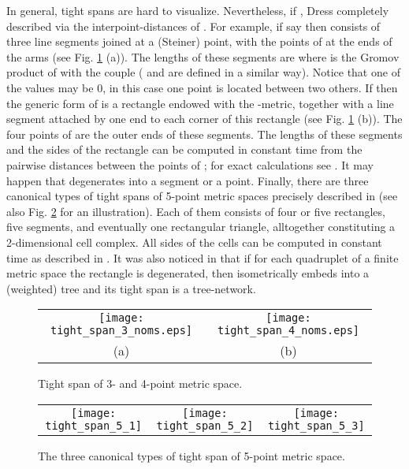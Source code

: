 \documentclass[11pt]{amsart}
\begin{document}
In general, tight spans are hard to
visualize. Nevertheless, if , Dress \cite{Dr} completely
described  via the interpoint-distances of . For example,
if  say   then  consists of three line
segments joined at a (Steiner) point, with the points of  at the
ends of the arms (see Fig. \ref{TS_3_4} (a)). The lengths of these
segments are  where
 is the Gromov product
of  with the couple  ( and  are defined
in a similar way). Notice that one of the values
 may be 0, in this case one point is
located between two others. If   then the generic form of
 is a rectangle  endowed with the -metric, together
with a line segment attached by one end to each corner of this
rectangle (see Fig. \ref{TS_3_4} (b)). The four points of  are the
outer ends of these segments. The lengths of these segments and the
sides of the rectangle can be computed in constant time from the
pairwise distances between the points of ;  for exact
calculations see \cite{Dr}. It may happen that  degenerates
into a segment or a point. Finally, there are three canonical types
of tight spans of 5-point metric spaces precisely described in
\cite{Dr} (see also Fig. \ref{TS_5} for an illustration). Each of
them consists of four or five rectangles, five segments, and
eventually one rectangular triangle, alltogether constituting a
2-dimensional cell complex. All sides of the cells can be computed
in constant  time as described in \cite{Dr}. It was also noticed in
\cite{Dr} that if for each quadruplet  of a finite metric space
 the rectangle  is degenerated, then 
isometrically embeds into a (weighted) tree and its tight span
 is a tree-network.



\begin{figure}
\begin{center}
\begin{tabular}{cc}
    \texttt{[image: tight\_span\_3\_noms.eps]} & \hspace{2cm}
\texttt{[image: tight\_span\_4\_noms.eps]} \vspace{-3mm}\\
(a) & \hspace{2cm}(b) \\
\end{tabular}
\end{center}
\caption{Tight span of 3- and 4-point metric space.}
\label{TS_3_4}
\end{figure}

\begin{figure}
\begin{center}
\begin{tabular}{ccc}
    \texttt{[image: tight\_span\_5\_1]} &
    \texttt{[image: tight\_span\_5\_2]} &
    \texttt{[image: tight\_span\_5\_3]} \\
\end{tabular}
\end{center}
\caption{The three canonical types of tight span of 5-point metric space.}
\label{TS_5}
\end{figure}
\end{document}
